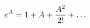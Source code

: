 \documentclass[preview]{standalone}
\begin{document}
\begin{align*}
e^A = 1 + A + {A^2 \over 2!} + \dots
\end{align*}
\end{document}
